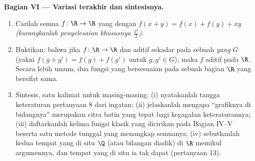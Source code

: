 \begin{problem}[{Soal akhir pekan --- $f(x + y) = f(x) + f(y)$:
keteraturan memaksa kelinearan, beserta potret monsternya}]
\medskip
\noindent\textbf{Bagian VI --- Variasi terakhir dan sintesisnya.}
\begin{enumerate}[resume]
  \item Carilah semua $f \colon \R \to \R$ yang  dengan $f(x + y)
        = f(x) + f(y) + xy$ \emph{(kurangkanlah penyelesaian
        khususnya $\frac{x^2}{2}$)}.
  \item Buktikan: bahwa jika $f \colon \R \to \R$  dan
        aditif sekadar pada sebuah \emph{ yang } $G$ (yakni
        $f(g + g') = f(g) + f(g')$ untuk $g, g' \in G$), maka $f$
        aditif pada $\R$. Secara lebih umum, dua fungsi 
        yang bersesuaian pada sebuah  bagian $\R$ yang  bersifat
        sama.
  \item Sintesis, satu kalimat untuk masing-masing: (i) nyatakanlah tangga
        keteraturan pertanyaan 8 dari ingatan; (ii) jelaskanlah mengapa
        ``grafiknya  di bidangnya'' merupakan citra batin yang tepat
        bagi kegagalan keteraturannya; (iii) daftarkanlah kelima
        fungsi klasik yang dicirikan pada Bagian IV--V beserta
        satu metode tunggal yang menangkap semuanya; (iv) sebutkanlah kedua
        tempat yang di situ  $\Q$ (atau bilangan diadik) di $\R$
        memikul argumennya, dan tempat yang di situ ia tak dapat
        (pertanyaan 13).

\end{enumerate}
\end{problem}

